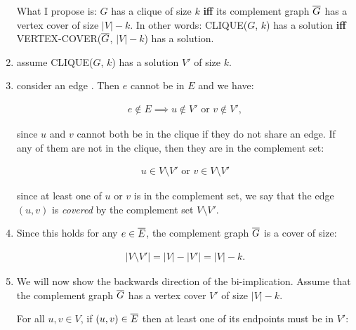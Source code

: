 \begin{enumerate}
    What I propose is: $G$ has a clique of size $k$ \textbf{iff} its complement
    graph $\overline{G}$ has a vertex cover of size $|V| - k$. In other words:
    CLIQUE($G$, $k$) has a solution \textbf{iff} VERTEX-COVER($\overline{G}$, $|V| -
    k$) has a solution.

  \item assume CLIQUE($G$, $k$) has a solution $V'$ of size $k$.

  \item consider an edge . Then $e$ cannot be in
    $E$ and we have:

    \begin{textred}
    \begin{align}
      e \not \in E \implies u \not \in V' \text{ or } v \not \in V',
    \end{align}
    \end{textred}

    since $u$ and $v$ cannot both be in the clique if they do not share an edge.
    If any of them are not in the clique, then they are in the complement set:
    
    \begin{textred}
    \begin{align}
      u \in V \setminus V' \text{ or } v \in V \setminus V'
    \end{align}
    \end{textred}

    since at least one of $u$ or $v$ is in the complement set, we say that the
    edge $(u, v)$ is \emph{covered} by the complement set $V \setminus V'$.

  \item Since this holds for any $e \in \overline{E}$, the complement graph $\overline{G}$
    is a cover of size:

      \begin{textred}
      \begin{align}
        |V \setminus V'| = |V| - |V'| = |V| - k.
      \end{align}
      \end{textred}

  \item We will now show the backwards direction of the bi-implication. Assume
    that the complement graph $\overline{G}$ has a vertex cover $V'$ of size $|V| -
    k$.

    For all $u, v \in V$, if $(u, v) \in \overline{E}$ then at least one of its
    endpoints must be in $V'$:


\end{enumerate}
